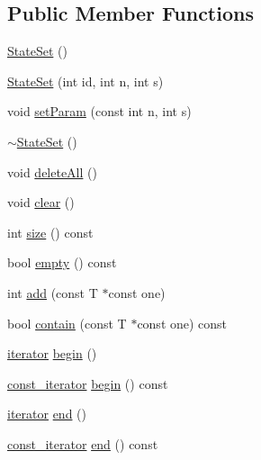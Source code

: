 \subsection*{Public Member Functions}
\begin{DoxyCompactItemize}
\item 
\mbox{\hyperlink{classgraphsat_1_1_state_set_a100b271697892dae7a7c8f60289cbf6e}{State\+Set}} ()
\item 
\mbox{\hyperlink{classgraphsat_1_1_state_set_a3c1c4c0746a478a9548f4de5ee14149e}{State\+Set}} (int id, int n, int s)
\item 
void \mbox{\hyperlink{classgraphsat_1_1_state_set_aaa4c599c542c6634fd7b7e6fb4697e2d}{set\+Param}} (const int n, int s)
\item 
\mbox{\hyperlink{classgraphsat_1_1_state_set_a80695c091bb5549583a09e7c71860a82}{$\sim$\+State\+Set}} ()
\item 
void \mbox{\hyperlink{classgraphsat_1_1_state_set_a9617a9bb6590058b3175abfc06c84ec7}{delete\+All}} ()
\item 
void \mbox{\hyperlink{classgraphsat_1_1_state_set_aadb01d38275e5dee296850aa974000de}{clear}} ()
\item 
int \mbox{\hyperlink{classgraphsat_1_1_state_set_a2ba142c5b450dd427534c48c4a9e0791}{size}} () const
\item 
bool \mbox{\hyperlink{classgraphsat_1_1_state_set_a263632e007a4c7b277f41d50dd153f72}{empty}} () const
\item 
int \mbox{\hyperlink{classgraphsat_1_1_state_set_af6735cbd6b54fea6c2dbfdecdb70f49f}{add}} (const T $\ast$const one)
\item 
bool \mbox{\hyperlink{classgraphsat_1_1_state_set_a8302bab8034c6f16cf9adbbd84b3a535}{contain}} (const T $\ast$const one) const
\item 
\mbox{\hyperlink{classgraphsat_1_1_state_set_1_1iterator}{iterator}} \mbox{\hyperlink{classgraphsat_1_1_state_set_ad5f5221dbe778039f0aed6404d3c34d8}{begin}} ()
\item 
\mbox{\hyperlink{classgraphsat_1_1_state_set_1_1const__iterator}{const\+\_\+iterator}} \mbox{\hyperlink{classgraphsat_1_1_state_set_a38ce7b2f5e1c5153621361420935aa54}{begin}} () const
\item 
\mbox{\hyperlink{classgraphsat_1_1_state_set_1_1iterator}{iterator}} \mbox{\hyperlink{classgraphsat_1_1_state_set_acd8eccd91d95757b70c7d84207d888d8}{end}} ()
\item 
\mbox{\hyperlink{classgraphsat_1_1_state_set_1_1const__iterator}{const\+\_\+iterator}} \mbox{\hyperlink{classgraphsat_1_1_state_set_af12eb07d08efb4b091302a2cf3b5e545}{end}} () const
\end{DoxyCompactItemize}
